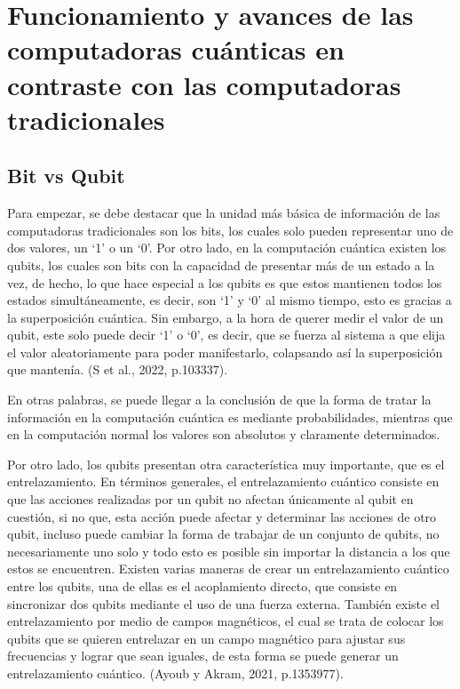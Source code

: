\documentclass{article}
\begin{document}
\section{Funcionamiento y avances de las computadoras cuánticas en contraste con las computadoras tradicionales}

\subsection{Bit vs Qubit}
Para empezar, se debe destacar que la unidad más básica de información de las computadoras tradicionales son los bits, los cuales solo pueden representar uno de dos valores, un ‘1’ o un ‘0’. Por otro lado, en la computación cuántica existen los qubits, los cuales son bits con la capacidad de presentar más de un estado a la vez, de hecho, lo que hace especial a los qubits es que estos mantienen todos los estados simultáneamente, es decir, son ‘1’ y ‘0’ al mismo tiempo, esto es gracias a la superposición cuántica. Sin embargo, a la hora de querer medir el valor de un qubit, este solo puede decir ‘1’ o ‘0’, es decir, que se fuerza al sistema a que elija el valor aleatoriamente para poder manifestarlo, colapsando así la superposición que mantenía. (S et al., 2022, p.103337).

En otras palabras, se puede llegar a la conclusión de que la forma de tratar la información en la computación cuántica es mediante probabilidades, mientras que en la computación normal los valores son absolutos y claramente determinados.

Por otro lado, los qubits presentan otra característica muy importante, que es el entrelazamiento. En términos generales, el entrelazamiento cuántico consiste en que las acciones realizadas por un qubit no afectan únicamente al qubit en cuestión, si no que, esta acción puede afectar y determinar las acciones de otro qubit, incluso puede cambiar la forma de trabajar de un conjunto de qubits, no necesariamente uno solo y todo esto es posible sin importar la distancia a los que estos se encuentren. 
Existen varias maneras de crear un entrelazamiento cuántico entre los qubits, una de ellas es el acoplamiento directo, que consiste en sincronizar dos qubits mediante el uso de una fuerza externa. También existe el entrelazamiento por medio de campos magnéticos, el cual se trata de colocar los qubits que se quieren entrelazar en un campo magnético para ajustar sus frecuencias y lograr que sean iguales, de esta forma se puede generar un entrelazamiento cuántico. (Ayoub y Akram, 2021, p.1353977).
\end{document}
